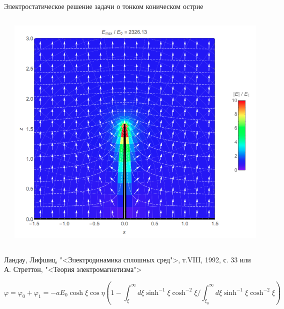 \documentclass[9pt, compress, xcolor=table]{beamer}
\begin{document}
\begin{frame}{Электростатическое решение задачи о тонком коническом острие}
\begin{columns}[c]
\begin{center}
 \end{center}
 \column{4cm}
\begin{center}
\includegraphics[width=\textwidth]{stat2}
\end{center}
\end{columns}

Ландау, Лифшиц, "<Электродинамика сплошных сред">, т.VIII, 1992, с. 33 или А. Стреттон, "<Теория электромагнетизма">

\begin{equation*}
\varphi = \varphi_0 + \varphi_1 = -a E_0 \cosh\xi\cos\eta\left(1-{\int_\xi^\infty d\xi \sinh^{-1}\xi\cosh^{-2}\xi}/{\int_{\xi_0}^\infty d\xi \sinh^{-1}\xi\cosh^{-2}\xi}\right)
\end{equation*}

\end{frame}
\end{document}
